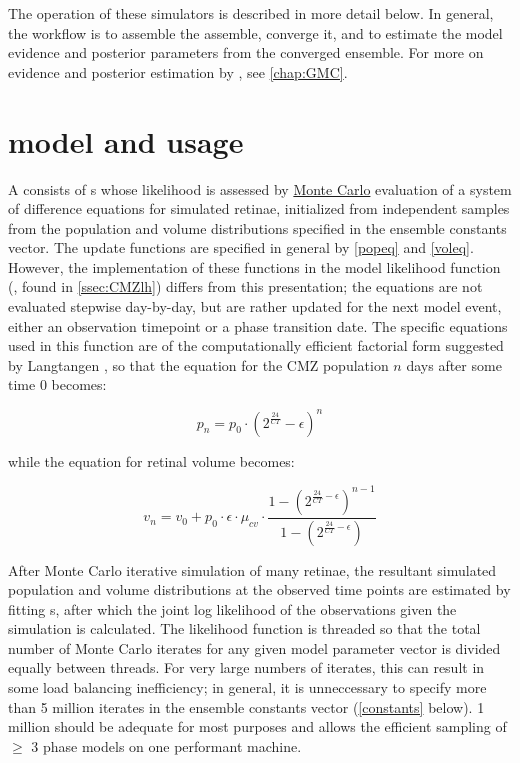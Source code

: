 The operation of these simulators is described in more detail below. In general, the workflow is to assemble the assemble, converge it, and to estimate the model evidence and posterior parameters from the converged ensemble. For more on evidence and posterior estimation by , see \autoref{chap:GMC}.

\section{\protect{} model and usage}
A  consists of s whose likelihood is assessed by \hyperref[MonteCarlo]{Monte Carlo} evaluation of a system of difference equations for simulated retinae, initialized from independent samples from the population and volume distributions specified in the ensemble constants vector. The update functions are specified in general by \autoref{popeq} and \autoref{voleq}. However, the implementation of these functions in the model likelihood function (, found in \autoref{ssec:CMZlh}) differs from this presentation; the equations are not evaluated stepwise day-by-day, but are rather updated for the next model event, either an observation timepoint or a phase transition date. The specific equations used in this function are of the computationally efficient factorial form suggested by Langtangen \cite[p. 559]{Langtangen2012}, so that the equation for the CMZ population $n$ days after some time 0 becomes:

\[
    p_n=p_{0} \cdot (2^{\frac{24}{CT}} - \epsilon)^{n}
\]

while the equation for retinal volume becomes:

\[
    v_n=v_{0} + p_{0} \cdot \epsilon \cdot \mu_{cv} \cdot \frac{1 - (2^{\frac{24}{CT} - \epsilon})^{n-1}}{1 - (2^{\frac{24}{CT} - \epsilon})}
\]

After Monte Carlo iterative simulation of many retinae, the resultant simulated population and volume distributions at the observed time points are estimated by fitting  s, after which the joint log likelihood of the observations given the simulation is calculated. The likelihood function is threaded so that the total number of Monte Carlo iterates for any given model parameter vector is divided equally between threads. For very large numbers of iterates, this can result in some load balancing inefficiency; in general, it is unneccessary to specify more than 5 million iterates in the ensemble constants vector (\autoref{constants} below). 1 million should be adequate for most purposes and allows the efficient sampling of $\geq$ 3 phase models on one performant machine.

